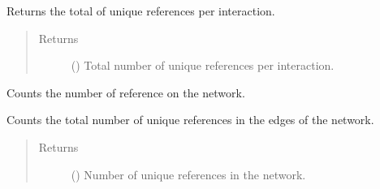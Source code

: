 \documentclass[letterpaper,10pt,english]{sphinxmanual}
\begin{document}
\begin{fulllineitems}
\begin{fulllineitems}
\label{\detokenize{reference:pypath.main.PyPath.numof_directed_edges}}
\end{fulllineitems}


\begin{fulllineitems}
\label{\detokenize{reference:pypath.main.PyPath.numof_reference_interaction_pairs}}
Returns the total of unique references per interaction.
\begin{quote}\begin{description}
\item[{Returns}] \leavevmode
() \textendash{} Total number of unique references per
interaction.

\end{description}\end{quote}

\end{fulllineitems}


\begin{fulllineitems}
\label{\detokenize{reference:pypath.main.PyPath.numof_references}}
Counts the number of reference on the network.

Counts the total number of unique references in the edges of the
network.
\begin{quote}\begin{description}
\item[{Returns}] \leavevmode
() \textendash{} Number of unique references in the network.

\end{description}\end{quote}

\end{fulllineitems}



\end{fulllineitems}
\end{document}
